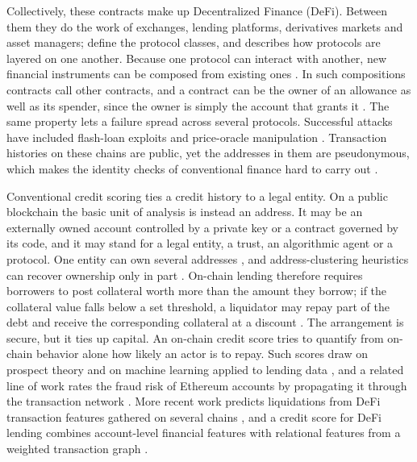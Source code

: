 Collectively, these contracts make up Decentralized Finance (DeFi). Between them they do the work of exchanges, lending platforms, derivatives markets and asset managers; \textcite{werner2022sok} define the protocol classes, and \textcite{schar2021defi} describes how protocols are layered on one another. Because one protocol can interact with another, new financial instruments can be composed from existing ones \parencite{kitzler2023defi}. In such compositions contracts call other contracts, and a contract can be the owner of an allowance as well as its spender, since the owner is simply the account that grants it \parencite{vogelsteller2015erc20}. The same property lets a failure spread across several protocols. Successful attacks have included flash-loan exploits \parencite{qin2021flashloans} and price-oracle manipulation \parencite{angeris2020oracles}. Transaction histories on these chains are public, yet the addresses in them are pseudonymous, which makes the identity checks of conventional finance hard to carry out \parencite{lin2025riskprop}.


Conventional credit scoring ties a credit history to a legal entity. On a public blockchain the basic unit of analysis is instead an address. It may be an externally owned account controlled by a private key or a contract governed by its code, and it may stand for a legal entity, a trust, an algorithmic agent or a protocol. One entity can own several addresses \parencite{douceur2002sybil}, and address-clustering heuristics can recover ownership only in part \parencite{victor2020clustering}. On-chain lending therefore requires borrowers to post collateral worth more than the amount they borrow; if the collateral value falls below a set threshold, a liquidator may repay part of the debt and receive the corresponding collateral at a discount \parencite{bartoletti2021lending}. The arrangement is secure, but it ties up capital. An on-chain credit score tries to quantify from on-chain behavior alone how likely an actor is to repay. Such scores draw on prospect theory \parencite{hassija2020lending} and on machine learning applied to lending data \parencite{kotb2023credit}, and a related line of work rates the fraud risk of Ethereum accounts by propagating it through the transaction network \parencite{lin2025riskprop}. More recent work predicts liquidations from DeFi transaction features gathered on several chains \parencite{palaiokrassas2024credit}, and a credit score for DeFi lending combines account-level financial features with relational features from a weighted transaction graph \parencite{m2026hurdle}.

